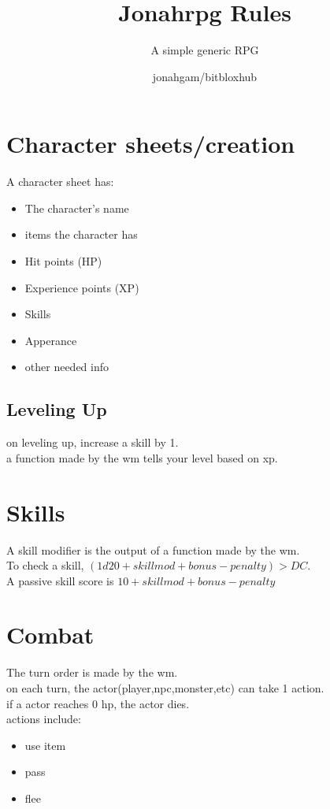 \documentclass[fontsize=11pt,paper=a4,pagesize=auto,openany]{scrbook}
\begin{document}
  \title{Jonahrpg Rules}
  \subtitle{A simple generic RPG}
  \author{jonahgam/bitbloxhub}
  \maketitle
  \tableofcontents

  \chapter{Character sheets/creation}
    A character sheet has:

    \begin{itemize}
      \item The character's name
      \item items the character has
      \item Hit points (HP)
      \item Experience points (XP)
      \item Skills
      \item Apperance
      \item other needed info
    \end{itemize}

    \section{Leveling Up}
      on leveling up, increase a skill by 1.\\
      a function made by the \gls{wm} tells your level based on xp.

  \chapter{Skills}
    A skill modifier is the output of a function made by the \gls{wm}.\\
    To check a skill, \((1d20 + skillmod + bonus - penalty) > DC \).\\
    A passive skill score is \(10 + skillmod + bonus - penalty\)

  \chapter{Combat}
    The turn order is made by the \gls{wm}.\\
    on each turn, the actor(player,npc,monster,etc) can take 1 action.\\
    if a actor reaches 0 hp, the actor dies.\\
    actions include:
    \begin{itemize}
      \item use item
      \item pass
      \item flee
    \end{itemize}
\end{document}
